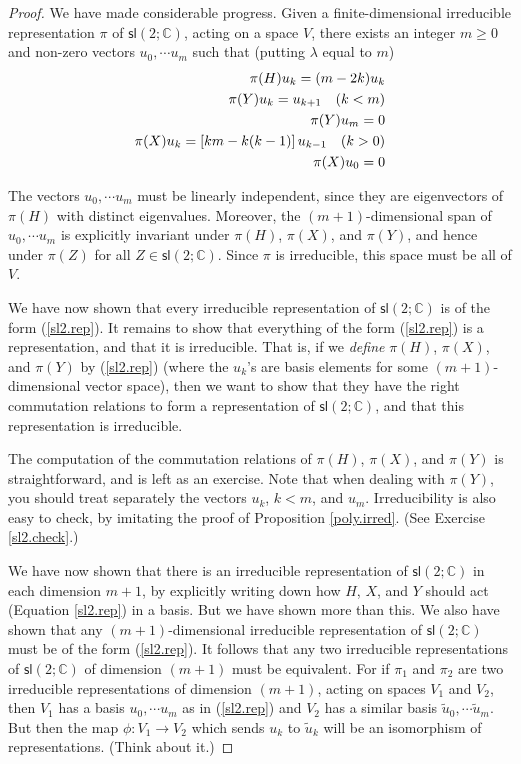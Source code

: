 \documentclass{amsbook}
\theoremstyle{plain}
\numberwithin{equation}{chapter}
\numberwithin{theorem}{chapter}
\begin{document}
\begin{proof}
We have made considerable progress. Given a finite-dimensional irreducible
representation $\pi$ of $\mathsf{sl}(2;\mathbb{C})$, acting on a space $V$,
there exists an integer $m\geq0$ and non-zero vectors $u_{0},\cdots u_{m}$
such that (putting $\lambda$ equal to $m$)
\begin{align}
\pi(H)u_{k}=(m-2k)u_{k}\nonumber\\
\pi(Y)u_{k}=u_{k+1}\quad(k<m)\nonumber\\
\pi(Y)u_{m}=0\nonumber\\
\pi(X)u_{k}=\left[  km-k(k-1)\right]  u_{k-1}\text{\quad}(k>0)\nonumber\\
\pi(X)u_{0}=0\label{sl2.rep}%
\end{align}

The vectors $u_{0},\cdots u_{m}$ must be linearly independent, since they are
eigenvectors of $\pi(H)$ with distinct eigenvalues. Moreover, the
$(m+1)$-dimensional span of $u_{0},\cdots u_{m}$ is explicitly invariant under
$\pi(H)$, $\pi(X)$, and $\pi(Y)$, and hence under $\pi(Z)$ for all
$Z\in\mathsf{sl}(2;\mathbb{C})$. Since $\pi$ is irreducible, this space must
be all of $V$.

We have now shown that every irreducible representation of $\mathsf{sl}%
(2;\mathbb{C})$ is of the form (\ref{sl2.rep}). It remains to show that
everything of the form (\ref{sl2.rep}) is a representation, and that it is
irreducible. That is, if we \textit{define} $\pi(H)$, $\pi(X)$, and $\pi(Y)$
by (\ref{sl2.rep}) (where the $u_{k}$'s are basis elements for some
$(m+1)$-dimensional vector space), then we want to show that they have the
right commutation relations to form a representation of $\mathsf{sl}%
(2;\mathbb{C})$, and that this representation is irreducible.

The computation of the commutation relations of $\pi(H)$, $\pi(X)$, and
$\pi(Y)$ is straightforward, and is left as an exercise. Note that when
dealing with $\pi(Y)$, you should treat separately the vectors $u_{k}$, $k<m$,
and $u_{m}$. Irreducibility is also easy to check, by imitating the proof of
Proposition \ref{poly.irred}. (See Exercise \ref{sl2.check}.)

We have now shown that there is an irreducible representation of
$\mathsf{sl}(2;\mathbb{C})$ in each dimension $m+1$, by explicitly writing
down how $H$, $X$, and $Y$ should act (Equation \ref{sl2.rep}) in a basis. But
we have shown more than this. We also have shown that any $(m+1)$-dimensional
irreducible representation of $\mathsf{sl}(2;\mathbb{C})$ must be of the form
(\ref{sl2.rep}). It follows that any two irreducible representations of
$\mathsf{sl}(2;\mathbb{C})$ of dimension $(m+1)$ must be equivalent. For if
$\pi_{1}$ and $\pi_{2}$ are two irreducible representations of dimension
$(m+1)$, acting on spaces $V_{1}$ and $V_{2}$, then $V_{1}$ has a basis
$u_{0},\cdots u_{m}$ as in (\ref{sl2.rep}) and $V_{2}$ has a similar basis
$\widetilde{u}_{0},\cdots\widetilde{u}_{m}$. But then the map $\phi
:V_{1}\rightarrow V_{2}$ which sends $u_{k}$ to $\widetilde{u}_{k}$ will be an
isomorphism of representations. (Think about it.)


\end{proof}
\end{document}

